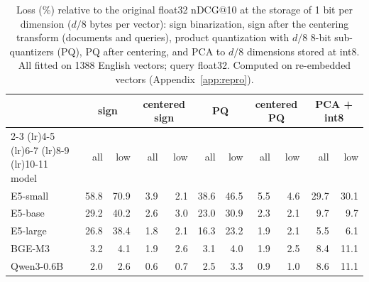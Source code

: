 \begin{table}[t]\centering\footnotesize
\begin{tabular}{lrrrrrrrrrr}
\toprule
 & \multicolumn{2}{c}{sign} & \multicolumn{2}{c}{centered sign} & \multicolumn{2}{c}{PQ} & \multicolumn{2}{c}{centered PQ} & \multicolumn{2}{c}{PCA + int8} \\
\cmidrule(lr){2-3} \cmidrule(lr){4-5} \cmidrule(lr){6-7} \cmidrule(lr){8-9} \cmidrule(lr){10-11}
model & all & low & all & low & all & low & all & low & all & low \\
\midrule
E5-small & 58.8 & 70.9 & 3.9 & 2.1 & 38.6 & 46.5 & 5.5 & 4.6 & 29.7 & 30.1 \\
E5-base & 29.2 & 40.2 & 2.6 & 3.0 & 23.0 & 30.9 & 2.3 & 2.1 & 9.7 & 9.7 \\
E5-large & 26.8 & 38.4 & 1.8 & 2.1 & 16.3 & 23.2 & 1.9 & 2.1 & 5.5 & 6.1 \\
BGE-M3 & 3.2 & 4.1 & 1.9 & 2.6 & 3.1 & 4.0 & 1.9 & 2.5 & 8.4 & 11.1 \\
Qwen3-0.6B & 2.0 & 2.6 & 0.6 & 0.7 & 2.5 & 3.3 & 0.9 & 1.0 & 8.6 & 11.1 \\
\bottomrule
\end{tabular}
\caption{Loss (\%) relative to the original float32 nDCG@10 at the storage of 1 bit per dimension ($d/8$ bytes per vector): sign binarization, sign after the centering transform (documents and queries), product quantization with $d/8$ 8-bit sub-quantizers (PQ), PQ after centering, and PCA to $d/8$ dimensions stored at int8. All fitted on 1388 English vectors; query float32. Computed on re-embedded vectors (Appendix~\ref{app:repro}).}\label{tab:matched}
\end{table}
